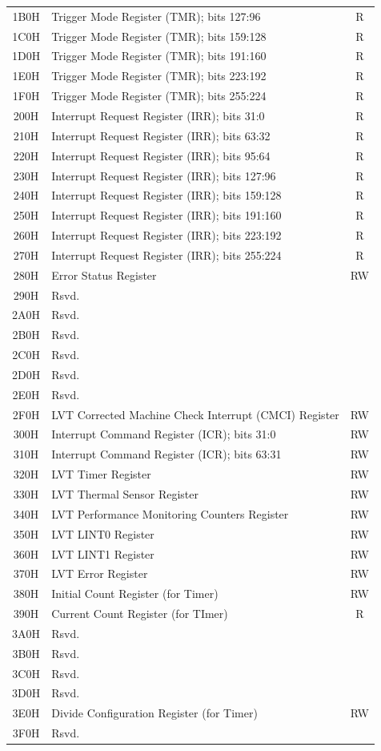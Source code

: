 \documentclass{article}
\begin{document}
\begin{longtable}{|c|l|c|}
  1B0H & Trigger Mode Register (TMR); bits 127:96 & R \\
  1C0H & Trigger Mode Register (TMR); bits 159:128 & R \\
  1D0H & Trigger Mode Register (TMR); bits 191:160 & R \\
  1E0H & Trigger Mode Register (TMR); bits 223:192 & R \\
  1F0H & Trigger Mode Register (TMR); bits 255:224 & R \\
  200H & Interrupt Request Register (IRR); bits 31:0 & R \\
  210H & Interrupt Request Register (IRR); bits 63:32 & R \\
  220H & Interrupt Request Register (IRR); bits 95:64 & R \\
  230H & Interrupt Request Register (IRR); bits 127:96 & R \\
  240H & Interrupt Request Register (IRR); bits 159:128 & R \\
  250H & Interrupt Request Register (IRR); bits 191:160 & R \\
  260H & Interrupt Request Register (IRR); bits 223:192 & R \\
  270H & Interrupt Request Register (IRR); bits 255:224 & R \\
  280H & Error Status Register & RW \\
  290H & Rsvd. & \\
  2A0H & Rsvd. & \\
  2B0H & Rsvd. & \\
  2C0H & Rsvd. & \\
  2D0H & Rsvd. & \\
  2E0H & Rsvd. & \\
  2F0H & LVT Corrected Machine Check Interrupt (CMCI) Register & RW \\
  300H & Interrupt Command Register (ICR); bits 31:0 & RW \\
  310H & Interrupt Command Register (ICR); bits 63:31 & RW \\
  320H & LVT Timer Register & RW \\
  330H & LVT Thermal Sensor Register & RW \\
  340H & LVT Performance Monitoring Counters Register & RW \\
  350H & LVT LINT0 Register & RW \\
  360H & LVT LINT1 Register & RW \\
  370H & LVT Error Register & RW \\
  380H & Initial Count Register (for Timer) & RW \\
  390H & Current Count Register (for TImer) & R \\
  3A0H & Rsvd. & \\
  3B0H & Rsvd. & \\
  3C0H & Rsvd. & \\
  3D0H & Rsvd. & \\
  3E0H & Divide Configuration Register (for Timer) & RW \\
  3F0H & Rsvd. & \\
\end{longtable}
\end{document}
